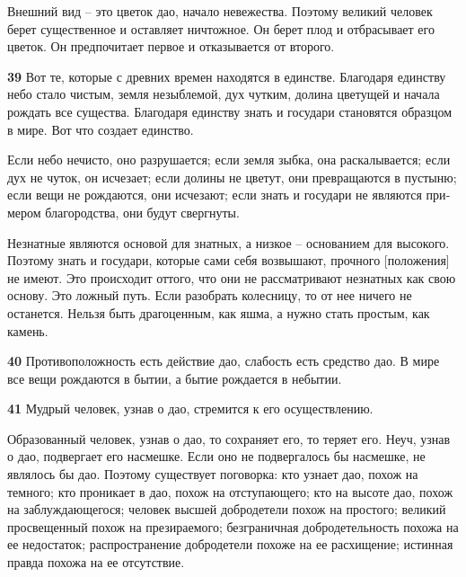 \documentclass[a4paper]{article}
\begin{document}
{
Внешний вид – это цветок дао, начало невежества. Поэтому великий человек берет существенное и оставляет ничтожное. Он
берет плод и отбрасывает его цветок. Он предпочитает первое и отказывается от второго.}

{\ttfamily
\foreignlanguage{russian}{\textrm{\textbf{39}}}\foreignlanguage{russian}{\textrm{ Вот те, которые с древних времен
находятся в единстве. Благодаря единству небо стало чистым, земля незыблемой, дух чутким, долина цветущей и начала
рождать все существа. Благодаря единству знать и государи становятся образцом в мире. Вот что создает единство.}}}

{\ttfamily
\foreignlanguage{russian}{\textrm{Если небо нечисто, оно разрушается; если земля зыбка, она раскалывается; если дух не
чуток, он исчезает; если долины не цветут, они превращаются в пустыню; если вещи не рождаются, они исчезают; если знать
и государи не являются примером благородства, они будут свергнуты.}}}

{
Незнатные являются основой для знатных, а низкое – основанием для высокого. Поэтому знать и государи, которые сами себя
возвышают, прочного [положения] не имеют. Это происходит оттого, что они не рассматривают незнатных как свою основу.
Это ложный путь. Если разобрать колесницу, то от нее ничего не останется. Нельзя быть драгоценным, как яшма, а нужно
стать простым, как камень.}

{\ttfamily
\foreignlanguage{russian}{\textrm{\textbf{40}}}\foreignlanguage{russian}{\textrm{ Противоположность есть действие дао,
слабость есть средство дао. В мире все вещи рождаются в бытии, а бытие рождается в небытии.}}}

{\ttfamily
\foreignlanguage{russian}{\textrm{\textbf{41}}}\foreignlanguage{russian}{\textrm{ Мудрый человек, узнав о дао, стремится
к его осуществлению.}}}

{
Образованный человек, узнав о дао, то сохраняет его, то теряет его. Неуч, узнав о дао, подвергает его насмешке. Если оно
не подвергалось бы насмешке, не являлось бы дао. Поэтому существует поговорка: кто узнает дао, похож на темного; кто
проникает в дао, похож на отступающего; кто на высоте дао, похож на заблуждающегося; человек высшей добродетели похож
на простого; великий просвещенный похож на презираемого; безграничная добродетельность похожа на ее недостаток;
распространение добродетели похоже на ее расхищение; истинная правда похожа на ее отсутствие.}
\end{document}
